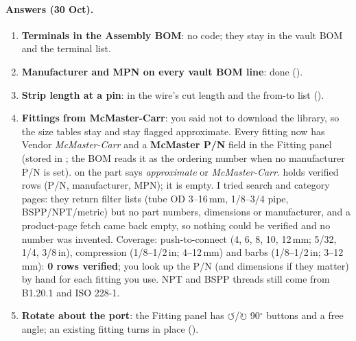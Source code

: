 \paragraph{Answers (30 Oct).}
\begin{enumerate}[nosep]
  \item \textbf{Terminals in the Assembly BOM}: no code; they stay in the vault BOM and the terminal list.
  \item \textbf{Manufacturer and MPN on every vault BOM line}: done ().
  \item \textbf{Strip length at a pin}: in the wire's cut length and the from-to list ().
  \item \textbf{Fittings from McMaster-Carr}: you said not to download the library, so the size tables stay
        and stay flagged approximate. Every fitting now has Vendor \emph{McMaster-Carr} and a
        \textbf{McMaster P/N} field in the Fitting panel (stored in ; the BOM reads it
        as the ordering number when no manufacturer P/N is set).  on the part says
        \emph{approximate} or \emph{McMaster-Carr}.  holds verified rows (P/N,
        manufacturer, MPN); it is empty. I tried  search and category pages: they return
        filter lists (tube OD 3--16\,mm, 1/8--3/4 pipe, BSPP/NPT/metric) but no part numbers, dimensions or
        manufacturer, and a product-page fetch came back empty, so nothing could be verified and no number was
        invented. Coverage: push-to-connect (4, 6, 8, 10, 12\,mm; 5/32, 1/4, 3/8\,in), compression (1/8--1/2\,in;
        4--12\,mm) and barbs (1/8--1/2\,in; 3--12\,mm): \textbf{0 rows verified}; you look up the P/N (and
        dimensions if they matter) by hand for each fitting you use. NPT and BSPP threads still come from
        B1.20.1 and ISO 228-1.
  \item \textbf{Rotate about the port}: the Fitting panel has $\circlearrowleft$/$\circlearrowright$ 90$^\circ$
        buttons and a free angle; an existing fitting turns in place ().
\end{enumerate}

